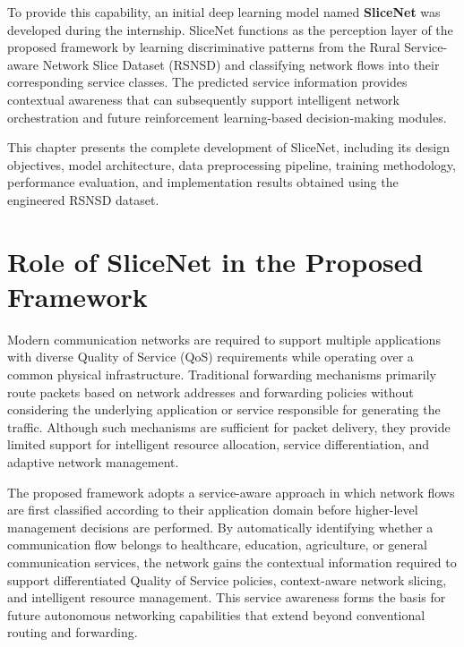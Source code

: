 \documentclass[12pt,a4paper]{report}
\begin{document}
	To provide this capability, an initial deep learning model named \textbf{SliceNet} was developed during the internship. SliceNet functions as the perception layer of the proposed framework by learning discriminative patterns from the Rural Service-aware Network Slice Dataset (RSNSD) and classifying network flows into their corresponding service classes. The predicted service information provides contextual awareness that can subsequently support intelligent network orchestration and future reinforcement learning-based decision-making modules.
	
	This chapter presents the complete development of SliceNet, including its design objectives, model architecture, data preprocessing pipeline, training methodology, performance evaluation, and implementation results obtained using the engineered RSNSD dataset.
	
	
	\section{Role of SliceNet in the Proposed Framework}
	\label{sec:role}
	
	Modern communication networks are required to support multiple applications with diverse Quality of Service (QoS) requirements while operating over a common physical infrastructure. Traditional forwarding mechanisms primarily route packets based on network addresses and forwarding policies without considering the underlying application or service responsible for generating the traffic. Although such mechanisms are sufficient for packet delivery, they provide limited support for intelligent resource allocation, service differentiation, and adaptive network management.
	
	The proposed framework adopts a service-aware approach in which network flows are first classified according to their application domain before higher-level management decisions are performed. By automatically identifying whether a communication flow belongs to healthcare, education, agriculture, or general communication services, the network gains the contextual information required to support differentiated Quality of Service policies, context-aware network slicing, and intelligent resource management. This service awareness forms the basis for future autonomous networking capabilities that extend beyond conventional routing and forwarding.
	
\end{document}

